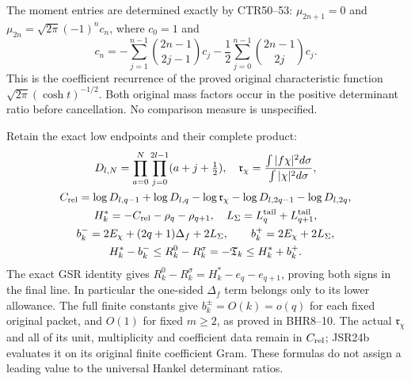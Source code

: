 \documentclass[11pt,a4paper]{article}
\begin{document}
The moment entries are determined exactly by CTR50--53:
$\mu_{2n+1}=0$ and $\mu_{2n}=\sqrt{2\pi}(-1)^nc_n$,
where $c_0=1$ and
\begin{equation}
 c_n=-\sum_{j=1}^{n-1}\binom{2n-1}{2j-1}c_j
          -\frac12\sum_{j=0}^{n-1}\binom{2n-1}{2j}c_j.
\end{equation}
This is the coefficient recurrence of the proved original
characteristic function $\sqrt{2\pi}(\cosh t)^{-1/2}$.
Both original mass factors occur in the positive determinant
ratio before cancellation. No comparison measure is unspecified.

Retain the exact low endpoints and their complete product:
\begin{equation}
\begin{gathered}
 D_{l,N}=\prod_{a=0}^N\prod_{j=0}^{2l-1}(a+j+\tfrac12),\quad
 \mathfrak r_\chi=\frac{\int|f\chi|^2d\sigma}{\int|\chi|^2d\sigma},\\
 C_{\rm rel}=\log D_{l,q-1}+\log D_{l,q}
 -\log\mathfrak r_\chi-\log D_{l,2q-1}-\log D_{l,2q},\\
 H_k^*=-C_{\rm rel}-\rho_q-\rho_{q+1},\quad
 L_\Sigma=L_q^{\rm tail}+L_{q+1}^{\rm tail},\\
 b_k^-=2E_\chi+(2q+1)\Delta_f+2L_\Sigma,\qquad
 b_k^+=2E_\chi+2L_\Sigma,\\
 H_k^*-b_k^-\leq R_k^0-R_k^\sigma=-\mathfrak T_k
                         \leq H_k^*+b_k^+.
\end{gathered}\label{eq:universal-return}
\end{equation}
The exact GSR identity gives
$R_k^0-R_k^\sigma=H_k^*-e_q-e_{q+1}$, proving both
signs in the final line. In particular the one-sided
$\Delta_f$ term belongs only to its lower allowance.
The full finite constants give $b_k^\pm=O(k)=o(q)$ for
each fixed original packet, and $O(1)$ for fixed $m\geq2$,
as proved in BHR8--10. The actual $\mathfrak r_\chi$ and
all of its unit, multiplicity and coefficient data remain
in $C_{\rm rel}$; JSR24b evaluates it on its original finite
coefficient Gram. These formulas do not assign a leading
value to the universal Hankel determinant ratios.
\end{document}
